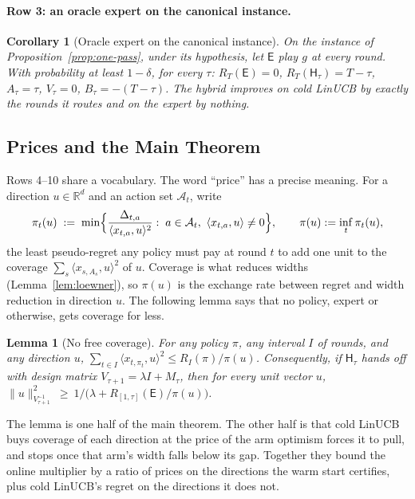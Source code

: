 \documentclass{article}
\newtheorem{lemma}{Lemma}
\newtheorem{corollary}{Corollary}
\theoremstyle{definition}
\theoremstyle{remark}
\newcommand{\R}{\mathbb{R}}
\theoremstyle{remark}
\newcommand{\Exp}{\mathsf{E}}
\newcommand{\Hyb}{\mathsf{H}}
\begin{document}
\paragraph{Row 3: an oracle expert on the canonical instance.}
\begin{corollary}[Oracle expert on the canonical instance]
\label{cor:cat-oracle}
On the instance of Proposition~\ref{prop:one-pass}, under its hypothesis, let
$\Exp$ play $g$ at every round. With probability at least $1-\delta$, for every
$\tau$: $R_T(\Exp)=0$, $R_T(\Hyb_\tau)=T-\tau$, $A_\tau=\tau$, $V_\tau=0$,
$B_\tau=-(T-\tau)$. The hybrid improves on cold LinUCB by exactly the rounds
it routes and on the expert by nothing.
\end{corollary}


\subsection{Prices and the Main Theorem}
\label{sec:price}

Rows 4--10 share a vocabulary. The word ``price'' has a precise meaning. For a direction $u\in\R^d$ and an
action set $\mathcal A_t$, write
\begin{equation}
\label{eq:price}
\pi_t(u)\;:=\;\min\Bigl\{\frac{\Delta_{t,a}}{\langle x_{t,a},u\rangle^2}:\;a\in\mathcal A_t,\ \langle x_{t,a},u\rangle\neq0\Bigr\},
\qquad \pi(u):=\inf_t\pi_t(u),
\end{equation}
the least pseudo-regret any policy must pay at round $t$ to add one unit to
the coverage $\sum_s\langle x_{s,A_s},u\rangle^2$ of $u$. Coverage is what
reduces widths (Lemma~\ref{lem:loewner}), so $\pi(u)$ is the exchange rate
between regret and width reduction in direction $u$. The following lemma
says that no policy, expert or otherwise, gets coverage for less.

\begin{lemma}[No free coverage]
\label{lem:no-free-coverage}
For any policy $\pi$, any interval $I$ of rounds, and any direction $u$,
$\sum_{t\in I}\langle x_{t,\pi_t},u\rangle^2\le R_I(\pi)/\pi(u)$.
Consequently, if $\Hyb_\tau$ hands off with design matrix $V_{\tau+1}=\lambda I+M_\tau$, then
for every unit vector $u$,
$\|u\|^2_{V_{\tau+1}^{-1}}\ \ge\ 1\big/\bigl(\lambda+R_{[1,\tau]}(\Exp)/\pi(u)\bigr)$.
\end{lemma}

The lemma is one half of the main theorem. The other half is that cold
LinUCB buys coverage of each direction at the price of the arm optimism
forces it to pull, and stops once that arm's width falls below its gap.
Together they bound the online multiplier by a ratio of prices on the
directions the warm start certifies, plus cold LinUCB's regret on the
directions it does not.
\end{document}
